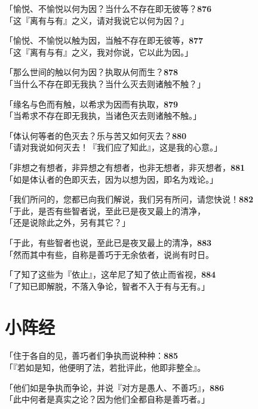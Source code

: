 「愉悦、不愉悦以何为因？当什么不存在即无彼等？\hfill{\grayfootnotesize \textbf{876}} \\
「这『离有与有』之义，请对我说它以何为因？」


「愉悦、不愉悦以触为因，当触不存在即无彼等，\hfill{\grayfootnotesize \textbf{877}} \\
「这『离有与有』之义，我对你说，它以此为因。」


「那么世间的触以何为因？执取从何而生？\hfill{\grayfootnotesize \textbf{878}} \\
「当什么不存在即无我执？当什么灭去则诸触不触？」


「缘名与色而有触，以希求为因而有执取，\hfill{\grayfootnotesize \textbf{879}} \\
「当希求不存在即无我执，当诸色灭去则诸触不触。」


「体认何等者的色灭去？乐与苦又如何灭去？\hfill{\grayfootnotesize \textbf{880}} \\
「请对我说如何灭去！『我们应了知此』，这是我的心意。」


「非想之有想者，非异想之有想者，也非无想者，非灭想者，\hfill{\grayfootnotesize \textbf{881}} \\
「如是体认者的色即灭去，因为以想为因，即名为戏论。」


「我们所问的，您都已向我们解说，我们另有所问，请您快说！\hfill{\grayfootnotesize \textbf{882}} \\
「于此，是否有些智者说，至此已是夜叉最上的清净，\\
「还是说除此之外，另有其它？」


「于此，有些智者也说，至此已是夜叉最上的清净，\hfill{\grayfootnotesize \textbf{883}} \\
「然而其中有些，自称是善巧于无余依者，说尚有时日。


「了知了这些为『依止』，这牟尼了知了依止而省视，\hfill{\grayfootnotesize \textbf{884}} \\
「了知已即解脱，不落入争论，智者不入于有与无有。」


\section{小阵经}


「住于各自的见，善巧者们争执而说种种：\hfill{\grayfootnotesize \textbf{885}} \\
「『若如是知，他便明了法，若批评此，他即非整全』。


「他们如是争执而争论，并说『对方是愚人、不善巧』，\hfill{\grayfootnotesize \textbf{886}} \\
「此中何者是真实之论？因为他们全都自称是善巧者。」


